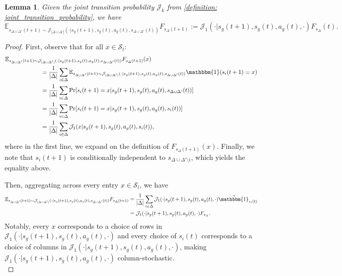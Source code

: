 \documentclass{article}
\theoremstyle{plain}
\newtheorem{lemma}[theorem]{Lemma}
\theoremstyle{definition}
\def\E{\mathbb{E}}
\begin{document}
\begin{lemma}\label{lemma: expected next empirical distribution linearity}Given the joint transition probability $\mathcal{J}_k$ from  \cref{definition: joint_transition_probability}, we have
\[\E_{s_{\Delta\cup\Delta'}(t+1)\sim\mathcal{J}_{|\Delta\cup\Delta'|}(\cdot|s_g(t+1), s_g(t), a_g(t), s_{\Delta\cup\Delta'}(t))} F_{s_\Delta (t+1)} :=  \mathcal{J}_{1}(\cdot|s_g(t+1),s_g(t), a_g(t), \cdot) F_{s_\Delta}(t).\]
\end{lemma}
\begin{proof}
First, observe that for all $x\in\mathcal{S}_l$:
\begin{align*}
&\E_{s_{\Delta\cup\Delta'}(t+1)\sim\mathcal{J}_{|\Delta\cup\Delta'|}(\cdot|s_g(t+1), s_g(t), a_g(t), s_{\Delta\cup\Delta'}(t))}F_{s_\Delta (t+1)}(x)  \\
&\quad\quad\quad\quad\quad\quad=\frac{1}{|\Delta|}\sum_{i\in\Delta}\E_{s_{\Delta\cup\Delta'}(t+1)\sim\mathcal{J}_{|\Delta\cup\Delta'|}(\cdot|s_g(t+1), s_g(t), a_g(t), s_{\Delta\cup\Delta'}(t))}\mathbbm{1}(s_i({t+1})=x)\\
    &\quad\quad\quad\quad\quad\quad= \frac{1}{|\Delta|}\sum_{i\in\Delta}\Pr[s_i(t+1) = x | s_g(t+1), s_g(t), a_g(t), s_{\Delta\cup\Delta'}(t))] \\
    &\quad\quad\quad\quad\quad\quad= \frac{1}{|\Delta|}\sum_{i\in\Delta}\Pr[s_i(t+1) = x | s_g(t+1), s_g(t), a_g(t), s_{i}(t))] \\
    &\quad\quad\quad\quad\quad\quad= \frac{1}{|\Delta|}\sum_{i\in\Delta}\mathcal{J}_{1}(x|s_g(t+1), s_g(t), a_g(t), s_{i}(t)),
\end{align*}
where in the first line, we expand on the definition of $F_{s_\Delta(t+1)}(x)$. Finally, we note that $s_i(t+1)$ is conditionally independent to $s_{\Delta\cup\Delta'\setminus i}$, which yields the equality above. 

Then, aggregating across every entry $x\in\mathcal{S}_l$, we have
\begin{align*}
    \E_{s_{\Delta\cup\Delta'}(t+1)\sim\mathcal{J}_{|\Delta\cup\Delta'|}(\cdot|s_g(t+1), s_g(t), a_g(t), s_{\Delta\cup\Delta'}(t))} F_{s_\Delta (t+1)} &= \frac{1}{|\Delta|}\sum_{i\in\Delta}\mathcal{J}_{1}(\cdot|s_g(t+1),s_g(t), a_g(t), \cdot) \vec{\mathbbm{1}}_{s_i(t)} \\
    &= \mathcal{J}_{1}(\cdot|s_g(t+1),s_g(t), a_g(t), \cdot) F_{s_\Delta}.
\end{align*}
Notably, every $x$ corresponds to a choice of rows in $\mathcal{J}_{1}(\cdot|s_g(t+1),s_g(t), a_g(t), \cdot)$ and every choice of $s_i(t)$ corresponds to a choice of columns in $\mathcal{J}_{1}(\cdot|s_g(t+1),s_g(t), a_g(t), \cdot)$, making $\mathcal{J}_{1}(\cdot|s_g(t+1),s_g(t), a_g(t), \cdot)$ column-stochastic.\qedhere\\
\end{proof}
\end{document}
